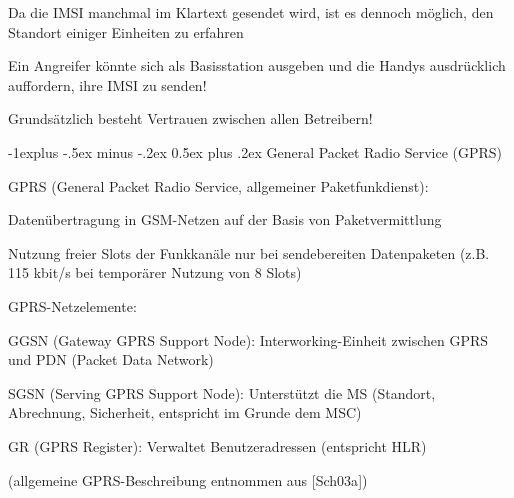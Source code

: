 \documentclass[a4paper]{article}
\makeatletter
\renewcommand{\subsection}{\@startsection{subsection}{2}{0mm}%
 {-1explus -.5ex minus -.2ex}%
 {0.5ex plus .2ex}%
 {\normalfont\normalsize\bfseries}}
\makeatother
\begin{document}
\begin{multicols}{3}
\begin{itemize*}
\begin{itemize*}
                  \item Da die IMSI manchmal im Klartext gesendet wird, ist es dennoch möglich, den Standort einiger Einheiten zu erfahren
                  \item Ein Angreifer könnte sich als Basisstation ausgeben und die Handys ausdrücklich auffordern, ihre IMSI zu senden!
            \end{itemize*}
            \item Grundsätzlich besteht Vertrauen zwischen allen Betreibern!
      \end{itemize*}

      \subsection{General Packet Radio Service
            (GPRS)}

      \begin{itemize*}
            \item GPRS (General Packet Radio Service, allgemeiner Paketfunkdienst):
            \begin{itemize*}
                  \item Datenübertragung in GSM-Netzen auf der Basis von Paketvermittlung
                  \item Nutzung freier Slots der Funkkanäle nur bei sendebereiten Datenpaketen (z.B. 115 kbit/s bei temporärer Nutzung von 8 Slots)
            \end{itemize*}
            \item GPRS-Netzelemente:
            \begin{itemize*}
                  \item GGSN (Gateway GPRS Support Node): Interworking-Einheit zwischen GPRS und PDN (Packet Data Network)
                  \item SGSN (Serving GPRS Support Node): Unterstützt die MS (Standort, Abrechnung, Sicherheit, entspricht im Grunde dem MSC)
                  \item GR (GPRS Register): Verwaltet Benutzeradressen (entspricht HLR)
            \end{itemize*}
      \end{itemize*}

      (allgemeine GPRS-Beschreibung entnommen aus {[}Sch03a{]})




\end{multicols}
\end{document}
